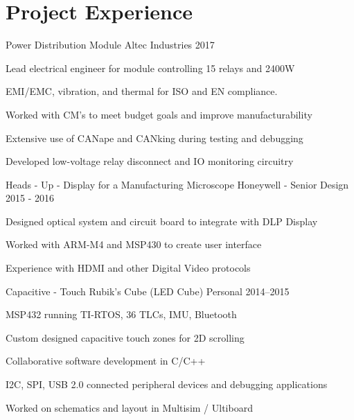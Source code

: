 \documentclass[]{bergman-cv} %
\begin{document}
\section{\sc Project Experience}
\begin{entrylist}
\entryFourItem
{Power Distribution Module}
{Altec Industries}
{2017}
{\begin{itemizenosep}
	\item Lead electrical engineer for module controlling 15 relays and 2400W
	\item EMI/EMC, vibration, and thermal for ISO and EN compliance.
	\item Worked with CM's to meet budget goals and improve manufacturability
	\item Extensive use of CANape and CANking during testing and debugging
	\item Developed low-voltage relay disconnect and IO monitoring circuitry
\end{itemizenosep}}
\entryFourItem
{Heads - Up - Display for a Manufacturing Microscope}
{Honeywell - Senior Design}
{2015 - 2016}
{\begin{itemizenosep}
	\item Designed optical system and circuit board to integrate with DLP Display
	\item Worked with ARM-M4 and MSP430 to create user interface
	\item Experience with HDMI and other Digital Video protocols
\end{itemizenosep}}
\entryFourItem
{Capacitive - Touch Rubik's Cube (LED Cube)}
{Personal}
{2014--2015}
{\begin{itemizenosep}
	\item MSP432 running TI-RTOS, 36 TLCs, IMU, Bluetooth
	\item Custom designed capacitive touch zones for 2D scrolling
	\item Collaborative software development in C/C++ 
	\item I2C, SPI, USB 2.0 connected peripheral devices and debugging applications
	\item Worked on schematics and layout in Multisim / Ultiboard
\end{itemizenosep}}

\end{entrylist}
\end{document}
